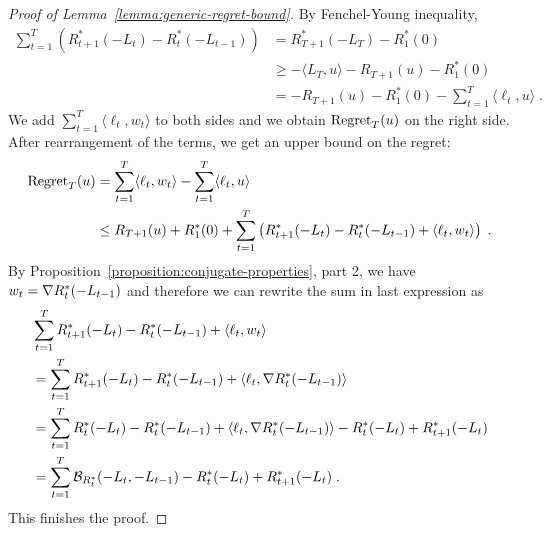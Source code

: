 \begin{proof}[Proof of Lemma~\ref{lemma:generic-regret-bound}]
By Fenchel-Young inequality,
\begin{align*}
\sum_{t=1}^T \left( R_{t+1}^*(-L_t) - R_t^*(-L_{t-1}) \right)
& = R_{T+1}^*(-L_T) - R_1^*(0) \\
& \ge - \langle L_T, u \rangle - R_{T+1}(u)  - R_1^*(0) \\
& = - R_{T+1}(u)  - R_1^*(0) - \sum_{t=1}^T \langle \ell_t, u \rangle \; .
\end{align*}
We add $\sum_{t=1}^T \langle \ell_t, w_t \rangle$ to both sides and we obtain
$\operatorname{Regret}_T(u)$ on the right side. After rearrangement of the terms, we get an upper bound
on the regret:
\begin{align*}
\operatorname{Regret}_T(u)
& = \sum_{t=1}^T \langle \ell_t, w_t \rangle - \sum_{t=1}^T \langle \ell_t, u \rangle \\
& \le R_{T+1}(u) + R_1^*(0) + \sum_{t=1}^T \left( R_{t+1}^*(-L_t) - R_t^*(-L_{t-1}) + \langle \ell_t, w_t \rangle \right) \; .
\end{align*}
By Proposition~\ref{proposition:conjugate-properties}, part 2, we have $w_t =
\nabla R_t^*(-L_{t-1})$ and therefore we can rewrite the sum in last expression as
\begin{align*}
& \sum_{t=1}^T R_{t+1}^*(-L_t) - R_t^*(-L_{t-1}) + \langle \ell_t, w_t \rangle \\
& = \sum_{t=1}^T R_{t+1}^*(-L_t) - R_t^*(-L_{t-1}) + \langle \ell_t, \nabla R_t^*(-L_{t-1}) \rangle \\
& = \sum_{t=1}^T R_t^*(-L_t) - R_t^*(-L_{t-1}) + \langle \ell_t, \nabla R_t^*(-L_{t-1}) \rangle - R_t^*(-L_t) + R_{t+1}^*(-L_t) \\
& = \sum_{t=1}^T \mathcal{B}_{R_t^*}(-L_t, -L_{t-1}) - R_t^*(-L_t) + R_{t+1}^*(-L_t) \; .
\end{align*}
This finishes the proof.
\end{proof}
